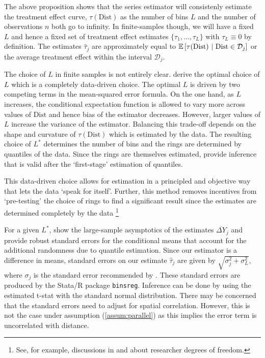 \documentclass[12pt]{article}
\newcommand{\dist}{\text{Dist}}
\begin{document}
The above proposition shows that the series estimator will consistenly estimate the treatment effect curve, $\tau(\dist)$ as the number of bins $L$ and the number of observations $n$ both go to infinity. In finite-samples though, we will have a fixed $L$ and hence a fixed set of treatment effect estimates $\{ \tau_1, \dots, \tau_{L}\}$ with $\tau_L \equiv 0$ by definition. The estimates $\hat{\tau}_j$ are approximately equal to $\condexpec{\tau(\dist)}{\dist \in \mathcal{D}_j}$ or the average treatment effect within the interval $\mathcal{D}_j$.

The choice of $L$ in finite samples is not entirely clear. \citet{Cattaneo_Crump_Farrell_Feng_2019} derive the optimal choice of $L$ which is a completely data-driven choice. The optimal $L$ is driven by two competing terms in the mean-squared error formula. On the one hand, as $L$ increases, the conditional expectation function is allowed to vary more across values of $\dist$ and hence bias of the estimator decreases. However, larger values of $L$ increase the variance of the estimator. Balancing this trade-off depends on the shape and curvature of $\tau(\dist)$ which is estimated by the data. The resulting choice of $L^*$ determines the number of bins and the rings are determined by quantiles of the data. Since the rings are themselves estimated, \citet{Cattaneo_Crump_Farrell_Feng_2019} provide inference that is valid after the `first-stage' estimation of quantiles. 

This data-driven choice allows for estimation in a principled and objective way that lets the data `speak for itself'. Further, this method removes incentives from `pre-testing' the choice of rings to find a significant result since the estimates are determined completely by the data \footnote{See, for example, discussions in \citet{Andrews_Kasy} and \citet{McCloskey_Michaillat} about researcher degrees of freedom.} 

For a given $L^*$, \citet{Cattaneo_Crump_Farrell_Feng_2019} show the large-sample asymptotics of the estimates $\overline{\Delta Y}_j$ and provide robust standard errors for the conditional means that account for the additional randomness due to quantile estimation. Since our estimator is a difference in means, standard errors on our estimate $\hat{\tau}_j$ are given by $\sqrt{\sigma^2_j + \sigma^2_L}$, where $\sigma_j$ is the standard error recommended by \citet{Cattaneo_Crump_Farrell_Feng_2019}. These standard errors are produced by the Stata/R package \texttt{binsreg}. Inference can be done by using the estimated t-stat with the standard normal distribution. There may be concerned that the standard errors need to adjust for spatial correlation. However, this is not the case under assumption (\ref{assum:parallel}) as this implies the error term is uncorrelated with distance.
\end{document}
